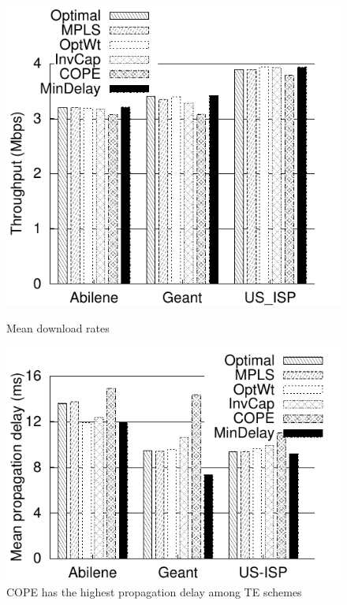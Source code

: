 \begin{figure}[t]
\begin{minipage}{0.45\textwidth}
\includegraphics[scale=0.6]{final_images/mean_throughput_hist_plot.pdf}
\caption{Mean download rates}
\label{fig:allisps_mean_throughputs}
\end{minipage}
\hspace{1cm}
\begin{minipage}{0.45\textwidth}
\includegraphics[scale=0.6]{final_images/G4_propdelay/mean_prop_delay_plot.pdf}
\caption{COPE has the highest propagation delay among TE schemes}
 \label{fig:prop_delay_all}
\end{minipage}
\end{figure}

